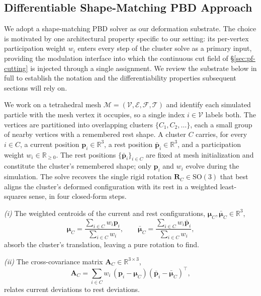 \subsection{Differentiable Shape-Matching PBD Approach}
\label{sec:pbd-substrate}
We adopt a shape-matching PBD solver as our deformation substrate.
The choice is motivated by one architectural property specific to our
setting: its per-vertex participation weight $w_i$ enters every step
of the cluster solve as a primary input, providing the modulation
interface into which the continuous cut field of
\S\ref{sec:pf-cutting} is injected through a single assignment. We
review the substrate below in full to establish the notation and the
differentiability properties subsequent sections will rely on.


We work on a tetrahedral mesh
$\mathcal{M}=(\mathcal{V},\mathcal{E},\mathcal{F},\mathcal{T})$ and
identify each simulated particle with the mesh vertex it occupies, so a
single index $i\in\mathcal{V}$ labels both. The vertices are partitioned
into overlapping clusters $\{C_1,C_2,\ldots\}$, each a small group of
nearby vertices with a remembered rest shape. A cluster $C$ carries,
for every $i\in C$, a current position $\mathbf{p}_i\in\mathbb{R}^3$, a
rest position $\bar{\mathbf{p}}_i\in\mathbb{R}^3$, and a participation
weight $w_i\in\mathbb{R}_{\geq0}$. The rest positions
$\{\bar{\mathbf{p}}_i\}_{i\in C}$ are fixed at mesh initialization and
constitute the cluster's remembered shape; only $\mathbf{p}_i$ and
$w_i$ evolve during the simulation. The solve recovers the single
rigid rotation $\mathbf{R}_C\in\mathrm{SO}(3)$ that best aligns the
cluster's deformed configuration with its rest in a weighted
least-squares sense, in four closed-form steps.
 
\emph{(i)} The weighted centroids of the current and rest
configurations, $\boldsymbol{\mu}_C,\bar{\boldsymbol{\mu}}_C\in\mathbb{R}^3$,
\begin{equation}
  \boldsymbol{\mu}_C =
    \frac{\sum_{i \in C} w_i \mathbf{p}_i}{\sum_{i \in C} w_i},
  \qquad
  \bar{\boldsymbol{\mu}}_C =
    \frac{\sum_{i \in C} w_i \bar{\mathbf{p}}_i}{\sum_{i \in C} w_i},
  \label{eq:centroid}
\end{equation}
absorb the cluster's translation, leaving a pure rotation to find.

\emph{(ii)} The cross-covariance matrix
$\mathbf{A}_C\in\mathbb{R}^{3\times3}$,
\begin{equation}
  \mathbf{A}_C = \sum_{i \in C} w_i\,
     (\mathbf{p}_i - \boldsymbol{\mu}_C)
     (\bar{\mathbf{p}}_i - \bar{\boldsymbol{\mu}}_C)^\top,
  \label{eq:covariance}
\end{equation}
relates current deviations to rest deviations.

